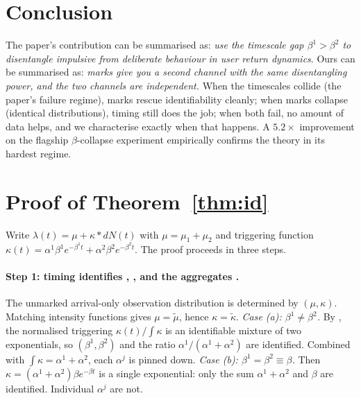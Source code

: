\documentclass[11pt]{article}
\theoremstyle{remark}
\begin{document}
\section{Conclusion}

The paper's contribution can be summarised as: \emph{use the timescale gap $\beta^1 > \beta^2$ to disentangle impulsive from deliberate behaviour in user return dynamics}. Ours can be summarised as: \emph{marks give you a second channel with the same disentangling power, and the two channels are independent.} When the timescales collide (the paper's failure regime), marks rescue identifiability cleanly; when marks collapse (identical distributions), timing still does the job; when both fail, no amount of data helps, and we characterise exactly when that happens. A $5.2\times$ improvement on the flagship $\beta$-collapse experiment empirically confirms the theory in its hardest regime.




\appendix
\section{Proof of Theorem~\ref{thm:id}}
\label{app:proof}

Write $\lambda(t) = \mu + \kappa \ast dN(t)$ with $\mu = \mu_1 + \mu_2$ and triggering function $\kappa(t) = \alpha^1 \beta^1 e^{-\beta^1 t} + \alpha^2 \beta^2 e^{-\beta^2 t}$. The proof proceeds in three steps.

\paragraph{Step 1: timing identifies \boldmath{$\mu$}, , and the aggregates .}
The unmarked arrival-only observation distribution is determined by $(\mu, \kappa)$. Matching intensity functions gives $\mu = \tilde\mu$, hence $\kappa = \tilde\kappa$.
\emph{Case (a): $\beta^1 \ne \beta^2$.} By \citet{teicher1961mixtures}, the normalised triggering $\kappa(t) / \int \kappa$ is an identifiable mixture of two exponentials, so $(\beta^1, \beta^2)$ and the ratio $\alpha^1/(\alpha^1+\alpha^2)$ are identified. Combined with $\int \kappa = \alpha^1 + \alpha^2$, each $\alpha^j$ is pinned down.
\emph{Case (b): $\beta^1 = \beta^2 \equiv \beta$.} Then $\kappa = (\alpha^1+\alpha^2)\beta e^{-\beta t}$ is a single exponential: only the sum $\alpha^1+\alpha^2$ and $\beta$ are identified. Individual $\alpha^j$ are not.
\end{document}
